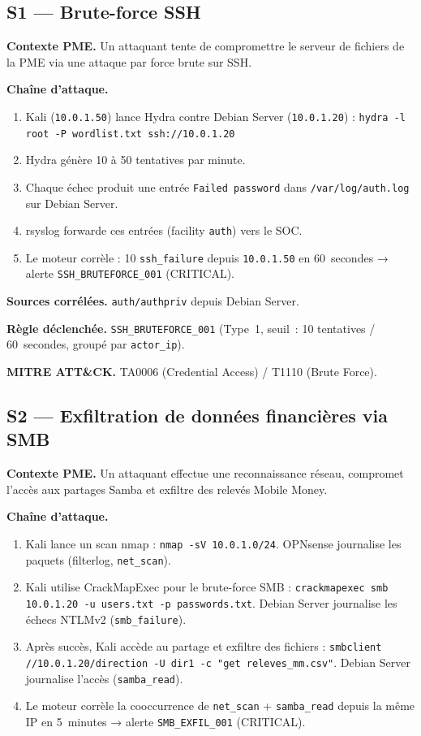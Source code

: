 \documentclass[12pt,a4paper]{article}
\begin{document}
\subsection{S1 --- Brute-force SSH}

\textbf{Contexte PME.} Un attaquant tente de compromettre le serveur
de fichiers de la PME via une attaque par force brute sur SSH.

\textbf{Chaîne d'attaque.}
\begin{enumerate}
    \item Kali (\texttt{10.0.1.50}) lance Hydra contre Debian Server
    (\texttt{10.0.1.20}) : \texttt{hydra -l root -P wordlist.txt ssh://10.0.1.20}
    \item Hydra génère 10 à 50 tentatives par minute.
    \item Chaque échec produit une entrée \texttt{Failed password} dans
    \texttt{/var/log/auth.log} sur Debian Server.
    \item rsyslog forwarde ces entrées (facility \texttt{auth}) vers le SOC.
    \item Le moteur corrèle : 10 \texttt{ssh\_failure} depuis
    \texttt{10.0.1.50} en 60~secondes → alerte \texttt{SSH\_BRUTEFORCE\_001}
    (CRITICAL).
\end{enumerate}

\textbf{Sources corrélées.} \texttt{auth/authpriv} depuis Debian Server.

\textbf{Règle déclenchée.} \texttt{SSH\_BRUTEFORCE\_001} (Type~1,
seuil~: 10 tentatives / 60~secondes, groupé par \texttt{actor\_ip}).

\textbf{MITRE ATT\&CK.} TA0006 (Credential Access) / T1110 (Brute Force).

\subsection{S2 --- Exfiltration de données financières via SMB}

\textbf{Contexte PME.} Un attaquant effectue une reconnaissance réseau,
compromet l'accès aux partages Samba et exfiltre des relevés Mobile Money.

\textbf{Chaîne d'attaque.}
\begin{enumerate}
    \item Kali lance un scan nmap : \texttt{nmap -sV 10.0.1.0/24}.
    OPNsense journalise les paquets (filterlog, \texttt{net\_scan}).
    \item Kali utilise CrackMapExec pour le brute-force SMB :
    \texttt{crackmapexec smb 10.0.1.20 -u users.txt -p passwords.txt}.
    Debian Server journalise les échecs NTLMv2 (\texttt{smb\_failure}).
    \item Après succès, Kali accède au partage et exfiltre des fichiers :
    \texttt{smbclient //10.0.1.20/direction -U dir1 -c "get releves\_mm.csv"}.
    Debian Server journalise l'accès (\texttt{samba\_read}).
    \item Le moteur corrèle la cooccurrence de \texttt{net\_scan} +
    \texttt{samba\_read} depuis la même IP en 5~minutes → alerte
    \texttt{SMB\_EXFIL\_001} (CRITICAL).
\end{enumerate}
\end{document}
